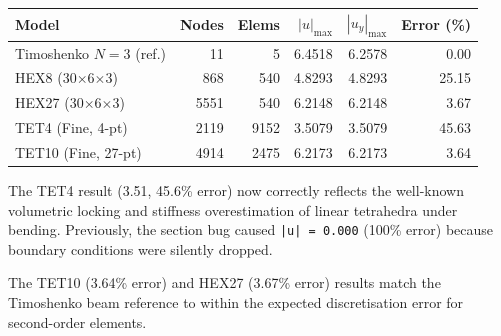 \begin{center}
\renewcommand{\arraystretch}{1.15}
\begin{tabular}{lrrrrr}
  \toprule
  Model                    & Nodes & Elems & $|u|_\text{max}$ & $|u_y|_\text{max}$ & Error (\%) \\
  \midrule
  Timoshenko $N=3$ (ref.)  &    11 &     5 &  6.4518 &  6.2578 &   0.00 \\
  HEX8  (30$\times$6$\times$3)     &   868 &   540 &  4.8293 &  4.8293 &  25.15 \\
  HEX27 (30$\times$6$\times$3)     &  5551 &   540 &  6.2148 &  6.2148 &   3.67 \\
  TET4  (Fine, 4-pt)      &  2119 &  9152 &  3.5079 &  3.5079 &  45.63 \\
  TET10 (Fine, 27-pt)     &  4914 &  2475 &  6.2173 &  6.2173 &   3.64 \\
  \bottomrule
\end{tabular}
\end{center}

The TET4 result (3.51, 45.6\% error) now correctly reflects the well-known
volumetric locking and stiffness overestimation of linear tetrahedra under
bending.  Previously, the section bug caused \texttt{|u| = 0.000} (100\%
error) because boundary conditions were silently dropped.

The TET10 (3.64\% error) and HEX27 (3.67\% error) results match the
Timoshenko beam reference to within the expected discretisation error for
second-order elements.
